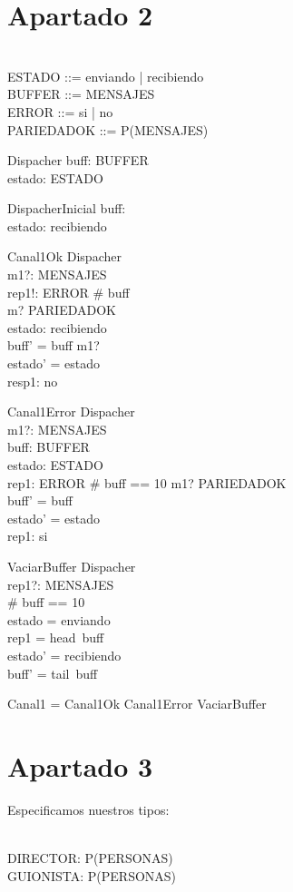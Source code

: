 \documentclass{article}
\begin{document}
\section{Apartado 2}
\begin{zed}
  [MENSAJES] \\
  ESTADO ::= enviando | recibiendo \\
  BUFFER ::= \langle MENSAJES \rangle \\
  ERROR ::= si | no \\
  PARIEDADOK ::= P(MENSAJES)
\end{zed}
\begin{schema}{Dispacher}
  buff: BUFFER \\
  estado: ESTADO
\end{schema}
\begin{schema}{DispacherInicial}
  buff: \langle \rangle \\
  estado: recibiendo
\end{schema}
\begin{schema}{Canal1Ok}
  \Delta Dispacher \\
  m1?: MENSAJES \\
  rep1!: ERROR
  \where
  \# buff  \\
  m? \in PARIEDADOK \\
  estado: recibiendo \\
  buff' = buff \dcat m1? \\
  estado' = estado \\
  resp1: no
\end{schema}
\begin{schema}{Canal1Error}
  \Xi Dispacher \\
  m1?: MENSAJES \\
  buff: BUFFER \\
  estado: ESTADO \\
  rep1: ERROR
  \where
  \# buff == 10 \cup m1? \notin PARIEDADOK \\
  buff' = buff \\
  estado' = estado \\
  rep1: si
\end{schema}
\begin{schema}{VaciarBuffer}
  \Delta Dispacher \\
  rep1?: MENSAJES \\
  \where
  \# buff == 10 \\
  estado = enviando \\
  rep1 = head\ buff \\
  estado' = recibiendo \\
  buff' = tail\ buff
\end{schema}
\begin{zed}
  Canal1 = Canal1Ok \cup Canal1Error \cup VaciarBuffer
\end{zed}

\section{Apartado 3}
Especificamos nuestros tipos:
\begin{zed}
  [PERSONAS] \\
  DIRECTOR: P(PERSONAS) \\
  GUIONISTA: P(PERSONAS)
\end{zed}
\end{document}
